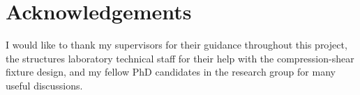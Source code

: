 \chapter*{Acknowledgements}

I would like to thank my supervisors for their guidance throughout this
project, the structures laboratory technical staff for their help with the
compression-shear fixture design, and my fellow PhD candidates in the
research group for many useful discussions.
